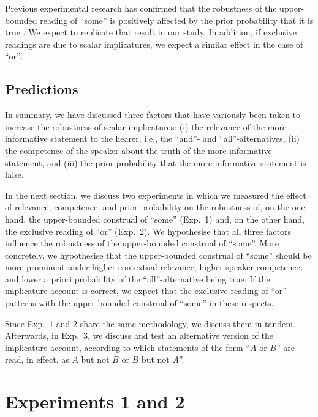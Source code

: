 \documentclass[12pt]{article}
\begin{document}
Previous experimental research has confirmed that the robustness of the upper-bounded reading of ``some'' is positively affected by the prior probability that it is true \citep{degen2015}. We expect to replicate that result in our study. In addition, if exclusive readings are due to scalar implicatures, we expect a similar effect in the case of ``or''.

\subsection*{Predictions}

In summary, we have discussed three factors that have variously been taken to increase the
robustness of scalar implicatures: (i) the relevance of the more informative statement to the
hearer, i.e., the ``and''- and ``all''-alternatives, (ii) the competence of the speaker about the
truth of the more informative statement, and (iii) the prior probability that the more
informative statement is false.

In the next section, we discuss two experiments in which we measured the effect of relevance,
competence, and prior probability on the robustness of, on the one hand, the upper-bounded
construal of ``some'' (Exp.\ 1) and, on the other hand, the exclusive reading of ``or'' (Exp.\
2). We hypothesise that all three factors influence the robustness of the upper-bounded
construal of ``some''. More concretely, we hypothesise that the upper-bounded construal of ``some''
should be more prominent under higher contextual relevance, higher speaker competence, and
lower a priori probability of the ``all''-alternative being true. If the implicature account is
correct, we expect that the exclusive reading of ``or'' patterns with the upper-bounded construal
of ``some'' in these respects.

Since Exp.\ 1 and 2 share the same methodology, we discuss them in tandem. Afterwards, in Exp.\ 3, we discuss and test an alternative version of the implicature account, according to which statements of the form ``$A$ or $B$'' are read, in effect, as $A$ but not $B$ or $B$ but not $A$''. 

\section{Experiments 1 and 2}
\end{document}

